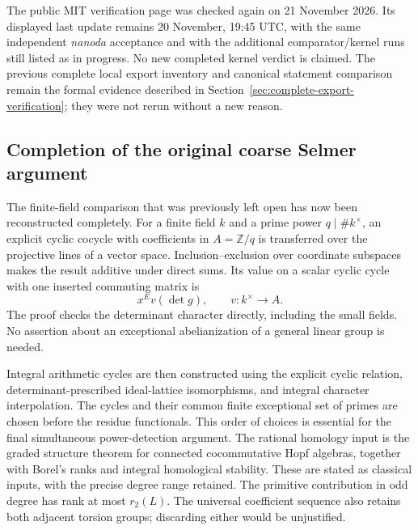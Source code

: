 \documentclass[11pt,a4paper]{article}
\theoremstyle{remark}
\newcommand{\Z}{\mathbb Z}
\begin{document}
The public MIT verification page was checked again on
21 November 2026. Its displayed last update remains
20 November, 19:45 UTC, with the same independent \emph{nanoda}
acceptance and with the additional comparator/kernel runs still
listed as in progress. No new completed kernel verdict is
claimed. The previous complete local export inventory and
canonical statement comparison remain the formal evidence
described in Section~\ref{sec:complete-export-verification};
they were not rerun without a new reason.

\subsection{Completion of the original coarse Selmer argument}

The finite-field comparison that was previously left open has now
been reconstructed completely. For a finite field $k$ and a prime
power $q\mid\#k^\times$, an explicit cyclic cocycle with coefficients
in $A=\Z/q$ is transferred over the projective lines of a vector
space. Inclusion--exclusion over coordinate subspaces makes the
result additive under direct sums. Its value on a scalar cyclic
cycle with one inserted commuting matrix is
\[
             x^E v(\det g),\qquad v:k^\times\longrightarrow A.
\]
The proof checks the determinant character directly, including
the small fields. No assertion about an exceptional abelianization
of a general linear group is needed.

Integral arithmetic cycles are then constructed using the explicit
cyclic relation, determinant-prescribed ideal-lattice isomorphisms,
and integral character interpolation. The cycles and their common
finite exceptional set of primes are chosen before the residue
functionals. This order of choices is essential for the final
simultaneous power-detection argument.
The rational homology input is the graded structure theorem for
connected cocommutative Hopf algebras, together with Borel's ranks
and integral homological stability. These are stated as classical
inputs, with the precise degree range retained.\cite{milnor-moore,weibel-kbook}
The primitive contribution in odd degree has rank at most
$r_2(L)$. The universal coefficient sequence also retains both
adjacent torsion groups; discarding either would be unjustified.
\end{document}
